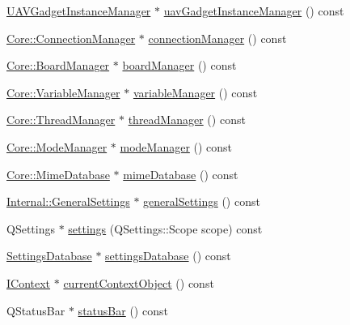 \begin{DoxyCompactItemize}
\item 
\hyperlink{class_core_1_1_u_a_v_gadget_instance_manager}{\-U\-A\-V\-Gadget\-Instance\-Manager} $\ast$ \hyperlink{group___core_plugin_ga2edd476d12d600aebca7dbced9b8d282}{uav\-Gadget\-Instance\-Manager} () const 
\item 
\hyperlink{class_core_1_1_connection_manager}{\-Core\-::\-Connection\-Manager} $\ast$ \hyperlink{group___core_plugin_ga3942909620084af15c1e375d738c9b10}{connection\-Manager} () const 
\item 
\hyperlink{class_core_1_1_board_manager}{\-Core\-::\-Board\-Manager} $\ast$ \hyperlink{group___core_plugin_ga7325ec21ffd857f0bd272a845f80e0c9}{board\-Manager} () const 
\item 
\hyperlink{class_core_1_1_variable_manager}{\-Core\-::\-Variable\-Manager} $\ast$ \hyperlink{group___core_plugin_ga031742760ce2003b77a2b2abdd7c34f6}{variable\-Manager} () const 
\item 
\hyperlink{class_core_1_1_thread_manager}{\-Core\-::\-Thread\-Manager} $\ast$ \hyperlink{group___core_plugin_ga9d593b4ed45b8e7fc6652a56829d3777}{thread\-Manager} () const 
\item 
\hyperlink{class_core_1_1_mode_manager}{\-Core\-::\-Mode\-Manager} $\ast$ \hyperlink{group___core_plugin_gac45c5a592157e5fa6521f7dfa811edae}{mode\-Manager} () const 
\item 
\hyperlink{class_core_1_1_mime_database}{\-Core\-::\-Mime\-Database} $\ast$ \hyperlink{group___core_plugin_gac877661e05b7a0bb1f6a56446ddd805c}{mime\-Database} () const 
\item 
\hyperlink{class_core_1_1_internal_1_1_general_settings}{\-Internal\-::\-General\-Settings} $\ast$ \hyperlink{group___core_plugin_ga5426092301e2717f66c384e4a33fe5c6}{general\-Settings} () const 
\item 
\-Q\-Settings $\ast$ \hyperlink{group___core_plugin_ga14fadbb1735f8dddb54ae61aee869a40}{settings} (\-Q\-Settings\-::\-Scope scope) const 
\item 
\hyperlink{class_core_1_1_settings_database}{\-Settings\-Database} $\ast$ \hyperlink{group___core_plugin_ga4768189d93215bf06dac570535a03fdd}{settings\-Database} () const 
\item 
\hyperlink{class_core_1_1_i_context}{\-I\-Context} $\ast$ \hyperlink{group___core_plugin_ga1e1438128ad3b24e3127f21ca65f3dba}{current\-Context\-Object} () const 
\item 
\-Q\-Status\-Bar $\ast$ \hyperlink{group___core_plugin_gad0b6f29ad56dcf30aca0db939eb985a0}{status\-Bar} () const 
\item 

\end{DoxyCompactItemize}
